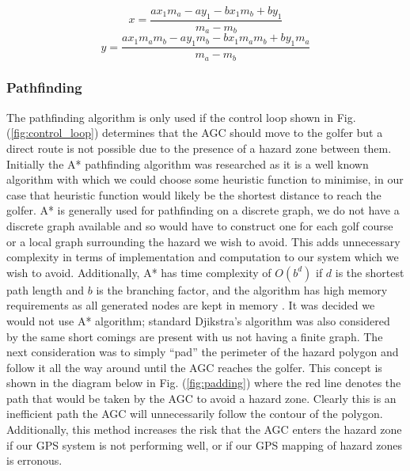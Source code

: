 \documentclass[11pt,landscape]{article}
\begin{document}
\begin{multicols}{3}
\begin{figure}[H]
\begin{mdframed}
    \begin{center}
        \begin{equation}
            x = \frac{ax_{1} m_{a} - ay_{1} - bx_{1} m_{b} + by_{1}}{m_{a} - m_{b}}
            \label{eq:x}
        \end{equation}
        \begin{equation}
            y = \frac{ax_{1} m_{a} m_{b} - ay_{1} m_{b} - bx_{1} m_{a} m_{b} + by_{1} m_{a}}{m_{a} - m_{b}}
            \label{eq:y}
        \end{equation}
    \end{center}
    \end{mdframed}
    \label{fig:segment_calculations}
\end{figure}

\subsubsection{Pathfinding}
The pathfinding algorithm is only used if the control loop shown in Fig.
(\ref{fig:control_loop}) determines that the AGC should move to the golfer but a
direct route is not possible due to the presence of a hazard zone between them.
Initially the A* pathfinding algorithm was researched as it is a well known
algorithm with which we could choose some heuristic function to minimise, in our
case that heuristic function would likely be the shortest distance to reach the
golfer. A* is generally used for pathfinding on a discrete graph, we do not have
a discrete graph available and so would have to construct one for each golf
course or a local graph surrounding the hazard we wish to avoid. This adds
unnecessary complexity in terms of implementation and computation to our system
which we wish to avoid. Additionally, A* has time complexity of $O(b^d)$ if $d$
is the shortest path length and $b$ is the branching factor, and the algorithm
has high memory requirements as all generated nodes are kept in memory
\cite{astar_2009}. It was decided we would not use A* algorithm; standard
Djikstra's algorithm was also considered by the same short comings are present
with us not having a finite graph. The next consideration was to simply ``pad''
the perimeter of the hazard polygon and follow it all the way around until the
AGC reaches the golfer. This concept is shown in the diagram below in Fig.
(\ref{fig:padding}) where the red line denotes the path that would be taken by
the AGC to avoid a hazard zone. Clearly this is an inefficient path the AGC will
unnecessarily follow the contour of the polygon. Additionally, this method
increases the risk that the AGC enters the hazard zone if our GPS system is not
performing well, or if our GPS mapping of hazard zones is erronous.  



\end{multicols}
\end{document}
